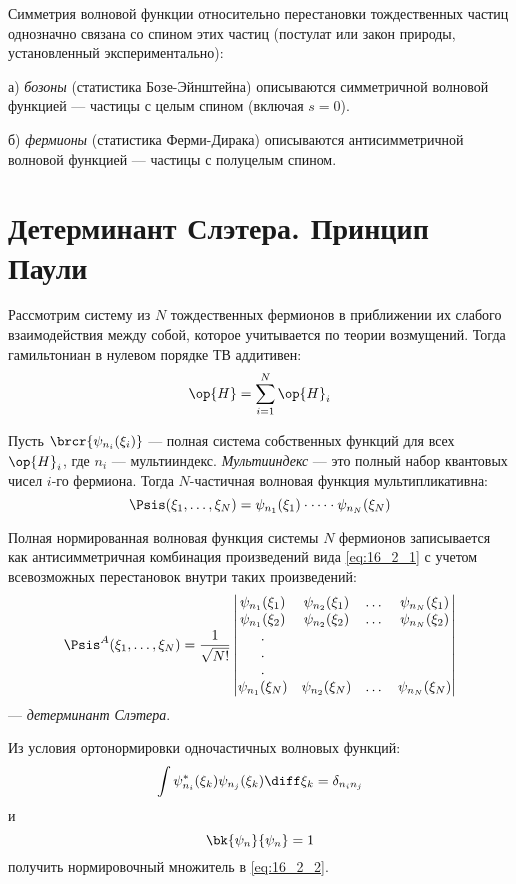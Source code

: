 Симметрия волновой функции относительно перестановки тождественных частиц однозначно связана со спином этих частиц (постулат или закон природы, установленный экспериментально):

а) {\em бозоны} (статистика Бозе-Эйнштейна) описываются симметричной волновой функцией --- частицы с целым спином (включая $s = 0$).

б) {\em фермионы} (статистика Ферми-Дирака) описываются антисимметричной волновой функцией --- частицы с полуцелым спином.

\section{Детерминант Слэтера. Принцип Паули}

Рассмотрим систему из $N$ тождественных фермионов в приближении их слабого взаимодействия между собой, которое учитывается по теории возмущений. Тогда гамильтониан в нулевом порядке ТВ аддитивен:
$$
\op{H} = \sum_{i=1}^N\op{H}_i
$$

Пусть $\brcr{\psi_{n_i}(\xi_i)}$ --- полная система собственных функций для всех $\op{H}_i$, где $n_i$ --- мультииндекс. {\em Мультииндекс} --- это полный набор квантовых чисел $i$-го фермиона. Тогда $N$-частичная волновая функция мультипликативна:
\begin{equation}
\label{eq:16_2_1}
\Psis(\xi_1, \dots, \xi_N) = \psi_{n_1}(\xi_1) \cdot \dots \cdot \psi_{n_N}(\xi_N)
\end{equation}

Полная нормированная волновая функция системы $N$ фермионов записывается как антисимметричная комбинация произведений вида \eqref{eq:16_2_1} с учетом всевозможных перестановок внутри таких произведений:
\begin{equation}
\label{eq:16_2_2}
\Psis^A(\xi_1, \dots, \xi_N) = \frac{1}{\sqrt{N!}} \left |
  \begin{matrix} 
  \psi_{n_1}(\xi_1) & \psi_{n_2}(\xi_1) & \dots &  \psi_{n_N}(\xi_1) \\
  \psi_{n_1}(\xi_2) & \psi_{n_2}(\xi_2) & \dots &  \psi_{n_N}(\xi_2) \\
  .                                &                                  &    &                                    \\
  .                                &                                  &    &                                    \\
  .                                &                                  &    &                                    \\
  \psi_{n_1}(\xi_N) & \psi_{n_2}(\xi_N) & \dots &  \psi_{n_N}(\xi_N)
  \end{matrix} \right |
\end{equation}
--- {\em детерминант Слэтера}.
\begin{excr}

Из условия ортонормировки одночастичных волновых функций: 
$$
\int \psi_{n_i}^*(\xi_k) \psi_{n_j}(\xi_k) \diff\xi_k = \delta_{n_i n_j}
$$
и 
$$
\bk{\psi_n}{\psi_n} = 1
$$
получить нормировочный множитель в \eqref{eq:16_2_2}.
\end{excr}

